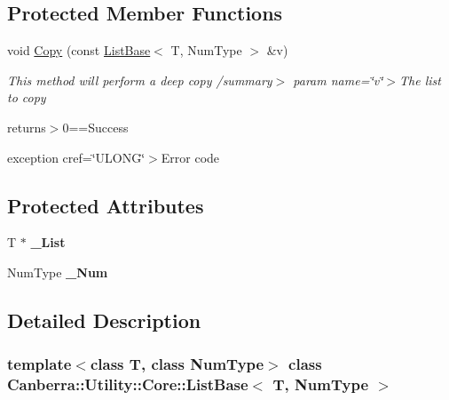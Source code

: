 \subsection*{Protected Member Functions}
\begin{DoxyCompactItemize}
\item 
\mbox{\label{class_canberra_1_1_utility_1_1_core_1_1_list_base_ad8b3c4d1f6cbba04f6495d5d13a6f0b5}} 
void \hyperlink{class_canberra_1_1_utility_1_1_core_1_1_list_base_ad8b3c4d1f6cbba04f6495d5d13a6f0b5}{Copy} (const \hyperlink{class_canberra_1_1_utility_1_1_core_1_1_list_base}{List\+Base}$<$ T, Num\+Type $>$ \&v)
\begin{DoxyCompactList}\small\item\em This method will perform a deep copy /summary$>$ param name=\char`\"{}v\char`\"{}$>$The list to copy

returns$>$0==Success

exception cref=\char`\"{}\+U\+L\+O\+N\+G\char`\"{}$>$Error code\end{DoxyCompactList}\end{DoxyCompactItemize}
\subsection*{Protected Attributes}
\begin{DoxyCompactItemize}
\item 
\mbox{\label{class_canberra_1_1_utility_1_1_core_1_1_list_base_a07367730f182c6b9c02aa566b76b152f}} 
T $\ast$ {\bfseries \+\_\+\+List}
\item 
\mbox{\label{class_canberra_1_1_utility_1_1_core_1_1_list_base_a35fd987bd3f0ae3fb917b838c1a2ee85}} 
Num\+Type {\bfseries \+\_\+\+Num}
\end{DoxyCompactItemize}


\subsection{Detailed Description}
\subsubsection*{template$<$class T, class Num\+Type$>$\newline
class Canberra\+::\+Utility\+::\+Core\+::\+List\+Base$<$ T, Num\+Type $>$}

